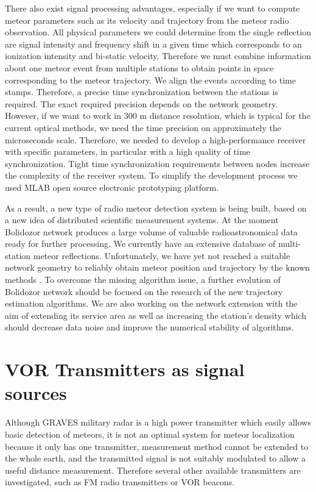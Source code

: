 \documentclass[twoside]{ctuthesis}
\theoremstyle{plain}
\theoremstyle{definition}
\theoremstyle{note}
\begin{document}
There also exist signal processing advantages, especially if we want to compute meteor parameters such as its velocity and trajectory from the meteor radio observation. All physical parameters we could determine from the single reflection are signal intensity and frequency shift in a given time which corresponds to an ionization intensity and bi-static velocity.
Therefore we must combine information about one meteor event from multiple stations to obtain points in space corresponding to the meteor trajectory. We align the events according to time stamps. Therefore, a precise time synchronization between the stations is required. The exact required precision depends on the network geometry. However, if we want to work in 300 m distance resolution, which is typical for the current optical methods, we need the time precision on approximately the microseconds scale. Therefore, we needed to develop a high-performance receiver with specific parameters, in particular with a high quality of time synchronization. Tight time synchronization requirements between nodes increase the complexity of the receiver system. To simplify the development process we used MLAB open source electronic prototyping platform.

As a result, a new type of radio meteor detection system is being built, based on a new idea of distributed scientific measurement systems. At the moment Bolidozor network produces a large volume of valuable radioastronomical data ready for further processing.  
We currently have an extensive database of multi-station meteor reflections. Unfortunately, we have yet not reached a suitable network geometry to reliably obtain meteor position and trajectory by the known methods \cite{Doppler_method}. 
To overcome the missing algorithm issue, a further evolution of Bolidozor network should be focused on the research of the new trajectory estimation algorithms. We are also working on the network extension with the aim of extending its service area as well as increasing the station's density which should decrease data noise and improve the numerical stability of algorithms. 

\section{VOR Transmitters as signal sources}
Although GRAVES military radar is a high power transmitter which easily allows basic detection of meteors, it is not an optimal system for meteor localization because it only has one transmitter, measurement method cannot be extended to the whole earth, and the transmitted signal is not suitably modulated to allow a useful distance measurement.  Therefore several other available transmitters are investigated, such as FM radio transmitters or VOR beacons. 
\end{document}
